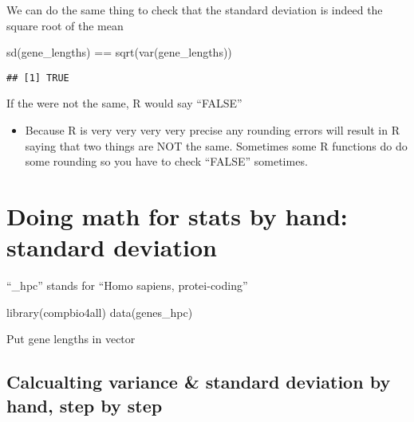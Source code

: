 \documentclass[
]{book}
\newenvironment{Shaded}{\begin{snugshade}}{\end{snugshade}}
\newcommand{\FunctionTok}[1]{\textcolor[rgb]{0.00,0.00,0.00}{#1}}
\newcommand{\NormalTok}[1]{#1}
\newcommand{\OtherTok}[1]{\textcolor[rgb]{0.56,0.35,0.01}{#1}}
\newcommand{\SpecialCharTok}[1]{\textcolor[rgb]{0.00,0.00,0.00}{#1}}
\providecommand{\tightlist}{%
  \setlength{\itemsep}{0pt}\setlength{\parskip}{0pt}}
\begin{document}
We can do the same thing to check that the standard deviation is indeed the square root of the mean

\begin{Shaded}
\begin{Highlighting}[]
\FunctionTok{sd}\NormalTok{(gene\_lengths) }\SpecialCharTok{==} \FunctionTok{sqrt}\NormalTok{(}\FunctionTok{var}\NormalTok{(gene\_lengths))}
\end{Highlighting}
\end{Shaded}

\begin{verbatim}
## [1] TRUE
\end{verbatim}

If the were not the same, R would say ``FALSE''

\begin{itemize}
\tightlist
\item
  Because R is very very very very precise any rounding errors will result in R saying that two things are NOT the same. Sometimes some R functions do do some rounding so you have to check ``FALSE'' sometimes.
\end{itemize}

\hypertarget{doing-math-for-stats-by-hand-standard-deviation}{%
\chapter{Doing math for stats by hand: standard deviation}\label{doing-math-for-stats-by-hand-standard-deviation}}

``\_hpc'' stands for ``Homo sapiens, protei-coding''

\begin{Shaded}
\begin{Highlighting}[]
\FunctionTok{library}\NormalTok{(compbio4all)}
\FunctionTok{data}\NormalTok{(genes\_hpc)}
\end{Highlighting}
\end{Shaded}

Put gene lengths in vector

\begin{Shaded}
\end{Shaded}

\hypertarget{calcualting-variance-standard-deviation-by-hand-step-by-step}{%
\section{Calcualting variance \& standard deviation by hand, step by step}\label{calcualting-variance-standard-deviation-by-hand-step-by-step}}
\end{document}
